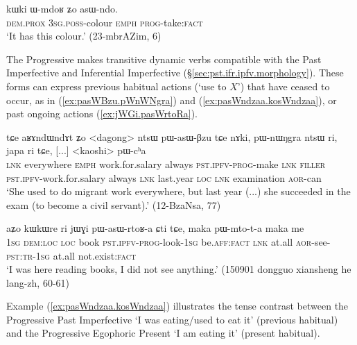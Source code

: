 \begin{exe}
\ex \label{ex:WmdoR.asWndo}
\gll kɯki ɯ-mdoʁ ʑo asɯ-ndo. \\
\textsc{dem}.\textsc{prox} \textsc{3sg}.\textsc{poss}-colour \textsc{emph} \textsc{prog}-take:\textsc{fact} \\
\glt `It has this colour.' (23-mbrAZim, 6)
\end{exe}

The Progressive makes transitive dynamic verbs compatible with the Past Imperfective and Inferential Imperfective (§\ref{sec:pst.ifr.ipfv.morphology}). These forms can express previous habitual actions (`use to $X$') that have ceased to occur, as in (\ref{ex:pasWBzu.pWnWNgra}) and (\ref{ex:pasWndzaa.kosWndzaa}), or past ongoing actions (\ref{ex:jWGi.pasWrtoRa}).

\begin{exe}
\ex \label{ex:pasWBzu.pWnWNgra}
\gll tɕe aʁɤndɯndɤt ʑo <dagong> ntsɯ pɯ-asɯ-βzu tɕe nɤki, pɯ-nɯŋgra ntsɯ ri, japa ri tɕe, [...] <kaoshi> pɯ-cʰa \\
\textsc{lnk} everywhere \textsc{emph} work.for.salary always \textsc{pst}.\textsc{ipfv}-\textsc{prog}-make \textsc{lnk} \textsc{filler} \textsc{pst}.\textsc{ipfv}-work.for.salary always \textsc{lnk} last.year \textsc{loc} \textsc{lnk} {  } examination \textsc{aor}-can \\
\glt `She used to do migrant work everywhere, but last year (...) she succeeded in the exam (to become a civil servant).' (12-BzaNsa, 77)
\end{exe}

\begin{exe}
\ex \label{ex:jWGi.pasWrtoRa}
\gll aʑo kɯkɯre ri jɯɣi pɯ-asɯ-rtoʁ-a ɕti tɕe, maka pɯ-mto-t-a maka me \\
\textsc{1sg} \textsc{dem}:\textsc{loc} \textsc{loc} book \textsc{pst}.\textsc{ipfv}-\textsc{prog}-look-\textsc{1sg} be.\textsc{aff}:\textsc{fact} \textsc{lnk} at.all \textsc{aor}-see-\textsc{pst}:\textsc{tr}-\textsc{1sg} at.all not.exist:\textsc{fact} \\
\glt `I was here reading books, I did not see anything.' (150901 dongguo xiansheng he lang-zh, 60-61)
\end{exe}

Example (\ref{ex:pasWndzaa.kosWndzaa}) illustrates the tense contrast between the Progressive Past Imperfective  `I was eating/used to eat it' (previous habitual) and the Progressive Egophoric Present  `I am eating it' (present habitual).

